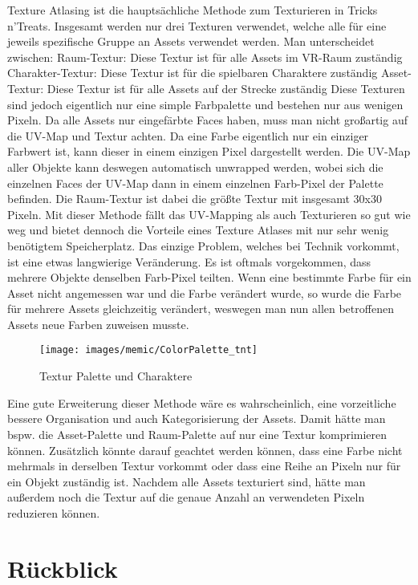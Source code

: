 Texture Atlasing ist die hauptsächliche Methode zum Texturieren in Tricks n’Treats. Insgesamt werden nur drei Texturen verwendet, welche alle für eine jeweils spezifische Gruppe an Assets verwendet werden. 
Man unterscheidet zwischen:
Raum-Textur: Diese Textur ist für alle Assets im VR-Raum zuständig
Charakter-Textur: Diese Textur ist für die spielbaren Charaktere zuständig
Asset-Textur: Diese Textur ist für alle Assets auf der Strecke zuständig
Diese Texturen sind jedoch eigentlich nur eine simple Farbpalette und bestehen nur aus wenigen Pixeln. Da alle Assets nur eingefärbte Faces haben, muss man nicht großartig auf die UV-Map und Textur achten. Da eine Farbe eigentlich nur ein einziger Farbwert ist, kann dieser in einem einzigen Pixel dargestellt werden. Die UV-Map aller Objekte kann deswegen automatisch unwrapped werden, wobei sich die einzelnen Faces der UV-Map dann in einem einzelnen Farb-Pixel der Palette befinden. Die Raum-Textur ist dabei die größte Textur mit insgesamt 30x30 Pixeln.
Mit dieser Methode fällt das UV-Mapping als auch Texturieren so gut wie weg und bietet dennoch die Vorteile eines Texture Atlases mit nur sehr wenig benötigtem Speicherplatz. Das einzige Problem, welches bei Technik vorkommt, ist eine etwas langwierige Veränderung. Es ist oftmals vorgekommen, dass mehrere Objekte denselben Farb-Pixel teilten. Wenn eine bestimmte Farbe für ein Asset nicht angemessen war und die Farbe verändert wurde, so wurde die Farbe für mehrere Assets gleichzeitig verändert, weswegen man nun allen betroffenen Assets neue Farben zuweisen musste.
\begin{figure}[H]
	\centering
	\texttt{[image: images/memic/ColorPalette\_tnt]}
	\caption{Textur Palette und Charaktere}
\end{figure}
Eine gute Erweiterung dieser Methode wäre es wahrscheinlich, eine vorzeitliche bessere Organisation und auch Kategorisierung der Assets. Damit hätte man bspw. die Asset-Palette und Raum-Palette auf nur eine Textur komprimieren können. Zusätzlich könnte darauf geachtet werden können, dass eine Farbe nicht mehrmals in derselben Textur vorkommt oder dass eine Reihe an Pixeln nur für ein Objekt zuständig ist. Nachdem alle Assets texturiert sind, hätte man außerdem noch die Textur auf die genaue Anzahl an verwendeten Pixeln reduzieren können.

\section{Rückblick}

